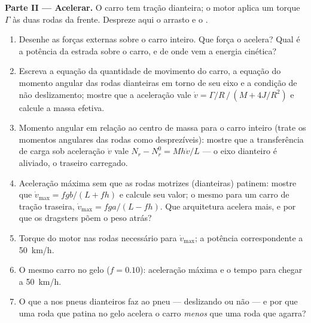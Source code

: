 \begin{problem}
\medskip
\noindent\textbf{Parte II --- Acelerar.}
O carro tem tração dianteira; o motor aplica um torque $\Gamma$ às
duas rodas da frente. Despreze aqui o arrasto e o .
\begin{enumerate}[resume]
  \item Desenhe as forças externas sobre o carro inteiro. Que força o
        acelera? Qual é a potência da estrada sobre o carro, e de onde
        vem a energia cinética?
  \item Escreva a equação da quantidade de movimento do carro, a equação do
        momento angular das rodas dianteiras em torno de seu eixo e a
        condição de não deslizamento; mostre que a aceleração vale $\dot v =
        \Gamma/R\,/\,(M + 4J/R^2)$ e calcule a massa efetiva.
  \item Momento angular em relação ao centro de massa para o carro inteiro
        (trate os momentos angulares das rodas como desprezíveis): mostre que
        a transferência de carga sob aceleração $\dot v$ vale $N_r - N_r^0 =
        Mh\dot v/L$ --- o eixo dianteiro é aliviado, o traseiro carregado.
  \item Aceleração máxima sem que as rodas motrizes (dianteiras)
        patinem: mostre que $\dot v_{\max} = fgb/(L + fh)$ e calcule
        seu valor; o mesmo para um carro de tração traseira, $\dot v_{\max} =
        fga/(L - fh)$. Que arquitetura acelera mais, e por que os
        dragsters põem o peso atrás?
  \item Torque do motor nas rodas necessário para $\dot v_{\max}$; a
        potência correspondente a \qty{50}{km/h}.
  \item O mesmo carro no gelo ($f = 0.10$): aceleração máxima e o
        tempo para chegar a \qty{50}{km/h}.
  \item O que a  nos pneus dianteiros faz ao pneu
        --- deslizando ou não --- e por que uma roda que patina no gelo
        acelera o carro \emph{menos} que uma roda que agarra?
\end{enumerate}


\end{problem}
